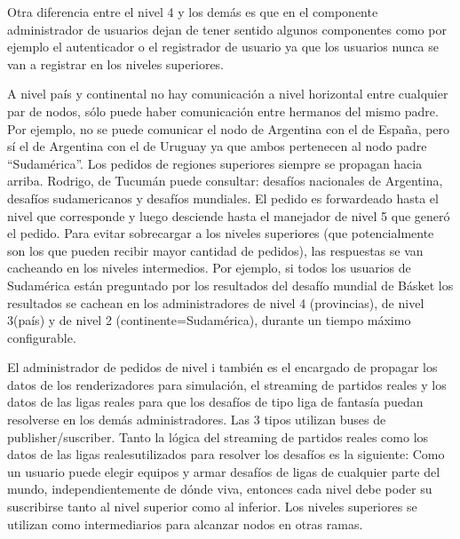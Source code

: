 Otra diferencia entre el nivel 4 y los demás es que en el componente administrador de usuarios dejan de tener sentido algunos componentes como por ejemplo el autenticador o el registrador de usuario ya que los usuarios nunca se van a registrar en los niveles superiores.

A nivel país y continental no hay comunicación a nivel horizontal entre cualquier par de nodos, sólo puede haber comunicación entre hermanos del mismo padre. Por ejemplo, no se puede comunicar el nodo de Argentina con el de España, pero sí el de Argentina con el de Uruguay ya que ambos pertenecen al nodo padre ``Sudamérica''. Los pedidos de regiones superiores siempre se propagan hacia arriba. Rodrigo, de Tucumán puede consultar: desafíos nacionales de Argentina, desafíos sudamericanos y desafíos mundiales. El pedido es forwardeado hasta el nivel que corresponde y luego desciende hasta el
manejador de nivel 5 que generó el pedido. Para evitar sobrecargar a los niveles superiores (que potencialmente son los que pueden recibir mayor cantidad de pedidos), las respuestas se van cacheando en los niveles intermedios. Por ejemplo,
si todos los usuarios de Sudamérica están preguntado por los resultados del desafío mundial de Básket los resultados
se cachean en los administradores de nivel 4 (provincias), de nivel 3(país) y de nivel 2 (continente=Sudamérica), durante un tiempo máximo configurable.


El administrador de pedidos de nivel i también es el encargado de propagar los datos de los renderizadores para simulación, el streaming de partidos reales y los datos de las ligas reales para que los desafíos de tipo liga de fantasía puedan resolverse
en los demás administradores.
Las 3 tipos utilizan buses de publisher/suscriber.
Tanto la lógica del streaming de partidos reales como los datos de las ligas realesutilizados para resolver los desafíos es la siguiente: Como un usuario puede elegir equipos y armar desafíos de ligas de cualquier parte del mundo, independientemente de dónde viva, entonces cada nivel debe poder su suscribirse tanto al nivel superior como al inferior. Los niveles superiores se utilizan como intermediarios para alcanzar nodos en otras ramas.

